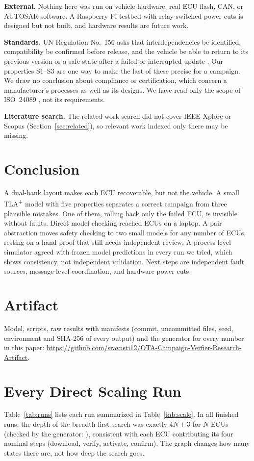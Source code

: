 \documentclass[journal]{IEEEtran}
\newcommand{\tla}{TLA\textsuperscript{+}}
\begin{document}
\textbf{External.} Nothing here was run on vehicle hardware, real ECU flash, CAN, or AUTOSAR software. A Raspberry Pi testbed with relay-switched power cuts is designed but not built, and hardware results are future work.

\textbf{Standards.} UN Regulation No.~156 asks that interdependencies be identified, compatibility be confirmed before release, and the vehicle be able to return to its previous version or a safe state after a failed or interrupted update \cite{unr156}. Our properties S1--S3 are one way to make the last of these precise for a campaign. We draw no conclusion about compliance or certification, which concern a manufacturer's processes as well as its designs. We have read only the scope of ISO~24089 \cite{iso24089}, not its requirements.

\textbf{Literature search.} The related-work search did not cover IEEE Xplore or Scopus (Section~\ref{sec:related}), so relevant work indexed only there may be missing.

\section{Conclusion}
A dual-bank layout makes each ECU recoverable, but not the vehicle. A small \tla{} model with five properties separates a correct campaign from three plausible mistakes. One of them, rolling back only the failed ECU, is invisible without faults. Direct model checking reached \ScaleAllFinishMax{} ECUs on a laptop. A pair abstraction moves safety checking to two small models for any number of ECUs, resting on a hand proof that still needs independent review. \ifsil A process-level simulator agreed with frozen model predictions in every run we tried, which shows consistency, not independent validation. \fi{}Next steps are independent fault sources, message-level coordination, and hardware power cuts.

\section*{Artifact}
Model, scripts, raw results with manifests (commit, uncommitted files, seed, environment and SHA-256 of every output) and the generator for every number in this paper: \url{https://github.com/sravasti12/OTA-Campaign-Verfier-Research-Artifact}.

\appendices
\section{Every Direct Scaling Run}
Table~\ref{tab:runs} lists each run summarized in Table~\ref{tab:scale}. In all \DepthRuns{} finished runs, the depth of the breadth-first search was exactly $4N+3$ for $N$ ECUs (checked by the generator: \DepthRule), consistent with each ECU contributing its four nominal steps (download, verify, activate, confirm). The graph changes how many states there are, not how deep the search goes.
\end{document}
